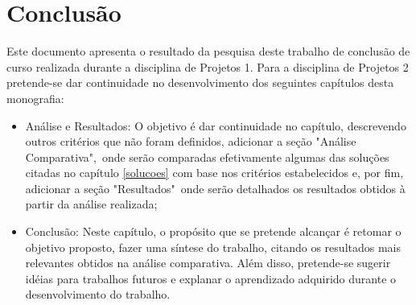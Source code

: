\chapter{Conclusão}
Este documento apresenta o resultado da pesquisa deste trabalho de conclusão de curso realizada durante a disciplina de Projetos 1. Para a disciplina de Projetos 2 pretende-se dar continuidade no desenvolvimento dos seguintes capítulos desta monografia:

\begin{itemize}
    \item Análise e Resultados: O objetivo é dar continuidade no capítulo, descrevendo outros critérios que não foram definidos, adicionar a seção "Análise Comparativa",\ onde serão comparadas efetivamente algumas das soluções citadas no capítulo \ref{solucoes} com base nos critérios estabelecidos e, por fim, adicionar a seção "Resultados"\ onde serão detalhados os resultados obtidos à partir da análise realizada;
    \item Conclusão: Neste capítulo, o propósito que se pretende alcançar é retomar o objetivo proposto, fazer uma síntese do trabalho, citando os resultados mais relevantes obtidos na análise comparativa. Além disso, pretende-se sugerir idéias para trabalhos futuros e explanar o aprendizado adquirido durante o desenvolvimento do trabalho.
\end{itemize}
